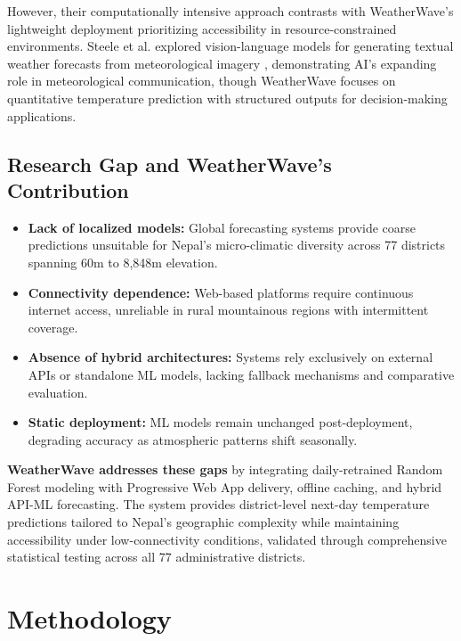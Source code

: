 \documentclass[conference]{IEEEtran}
\begin{document}
However, their computationally intensive approach contrasts with WeatherWave's lightweight deployment prioritizing accessibility in resource-constrained environments. Steele et al. explored vision-language models for generating textual weather forecasts from meteorological imagery \cite{b12}, demonstrating AI's expanding role in meteorological communication, though WeatherWave focuses on quantitative temperature prediction with structured outputs for decision-making applications.
\subsection{Research Gap and WeatherWave's Contribution}

\begin{itemize}

  \item \textbf{Lack of localized models:} Global forecasting systems provide coarse predictions unsuitable for Nepal's micro-climatic diversity across 77 districts spanning 60m to 8,848m elevation.
  
  \item \textbf{Connectivity dependence:} Web-based platforms require continuous internet access, unreliable in rural mountainous regions with intermittent coverage.
  
  \item \textbf{Absence of hybrid architectures:} Systems rely exclusively on external APIs or standalone ML models, lacking fallback mechanisms and comparative evaluation.
  
  \item \textbf{Static deployment:} ML models remain unchanged post-deployment, degrading accuracy as atmospheric patterns shift seasonally.
\end{itemize}
\textbf{WeatherWave addresses these gaps} by integrating daily-retrained Random Forest modeling with Progressive Web App delivery, offline caching, and hybrid API-ML forecasting. The system provides district-level next-day temperature predictions tailored to Nepal's geographic complexity while maintaining accessibility under low-connectivity conditions, validated through comprehensive statistical testing across all 77 administrative districts.



\section{Methodology}
\end{document}

